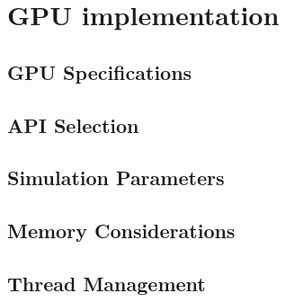 \chapter{GPU implementation}
\section{GPU Specifications}
\section{API Selection}
\section{Simulation Parameters}
\section{Memory Considerations}
\section{Thread Management}
